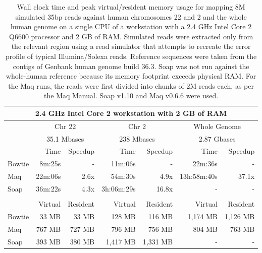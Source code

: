 \documentclass[letterpaper]{article}
\begin{document}
\begin{table}[tp]
\scriptsize
\begin{tabular}{lrrrrrr}
\multicolumn{7}{c}{\small{2.4 GHz Intel Core 2 workstation with 2 GB of RAM}} \\[3pt] 
\toprule
 & \multicolumn{2}{c}{Chr 22} & \multicolumn{2}{c}{Chr 2} & \multicolumn{2}{c}{Whole Genome} \\[3pt] 
 & \multicolumn{2}{c}{35.1 Mbases} & \multicolumn{2}{c}{238 Mbases} & \multicolumn{2}{c}{2.87 Gbases} \\[3pt] 
 & Time & Speedup & Time & Speedup & Time & Speedup \\ 
\toprule
Bowtie & 8m:25s & - & 11m:06s & - & 22m:36s & -  \\ \midrule 
Maq & 22m:06s & 2.6x & 54m:30s & 4.9x & 13h:58m:40s & 37.1x  \\ \midrule 
Soap & 36m:22s & 4.3x & 3h:06m:29s & 16.8x & - & -  \\[2pt] \bottomrule \\ 
 & Virtual & Resident & Virtual & Resident & Virtual & Resident \\ 
\toprule
Bowtie & 33 MB & 33 MB & 128 MB & 116 MB & 1,174 MB & 1,126 MB  \\ \midrule 
Maq & 767 MB & 727 MB & 796 MB & 756 MB & 804 MB & 763 MB  \\ \midrule 
Soap & 393 MB & 380 MB & 1,417 MB & 1,331 MB & - & -  \\ 
\bottomrule
\end{tabular}
\scriptsize\caption{Wall clock time and peak virtual/resident memory usage for mapping 8M simulated 35bp reads against human chromosomes 22 and 2 and the whole human genome on a single CPU of a workstation with a 2.4 GHz Intel Core 2 Q6600 processor and 2 GB of RAM. Simulated reads were extracted only from the relevant region using a read simulator that attempts to recreate the error profile of typical Illumina/Solexa reads. Reference sequences were taken from the contigs of Genbank human genome build 36.3. Soap was not run against the whole-human reference because its memory footprint exceeds physical RAM. For the Maq runs, the reads were first divided into chunks of 2M reads each, as per the Maq Manual. Soap v1.10 and Maq v0.6.6 were used.}
\end{table}
\end{document}
